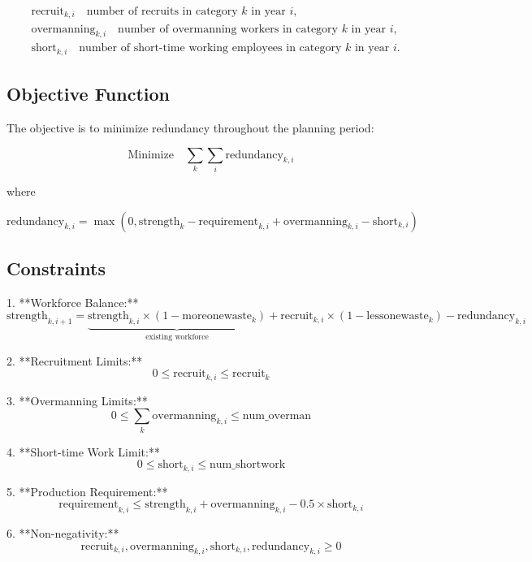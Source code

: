 \documentclass{article}
\begin{document}
\begin{align*}
    & \text{recruit}_{k, i} \quad \text{number of recruits in category } k \text{ in year } i, \\
    & \text{overmanning}_{k, i} \quad \text{number of overmanning workers in category } k \text{ in year } i, \\
    & \text{short}_{k, i} \quad \text{number of short-time working employees in category } k \text{ in year } i.
\end{align*}

\subsection*{Objective Function}

The objective is to minimize redundancy throughout the planning period:

\[
\text{Minimize} \quad \sum_{k} \sum_{i} \text{redundancy}_{k, i}
\]

where

\[
\text{redundancy}_{k, i} = \max\left(0, \text{strength}_{k} - \text{requirement}_{k, i} + \text{overmanning}_{k, i} - \text{short}_{k, i} \right)
\]

\subsection*{Constraints}

1. **Workforce Balance:**
   \[
   \text{strength}_{k, i+1} = \underbrace{\text{strength}_{k, i} \times (1 - \text{moreonewaste}_{k})}_{\text{existing\ workforce}} + \text{recruit}_{k, i} \times (1 - \text{lessonewaste}_{k}) - \text{redundancy}_{k, i} 
   \]

2. **Recruitment Limits:**
   \[
   0 \leq \text{recruit}_{k, i} \leq \text{recruit}_{k}
   \]

3. **Overmanning Limits:**
   \[
   0 \leq \sum_{k} \text{overmanning}_{k, i} \leq \text{num\_overman}
   \]

4. **Short-time Work Limit:**
   \[
   0 \leq \text{short}_{k, i} \leq \text{num\_shortwork}
   \]

5. **Production Requirement:**
   \[
   \text{requirement}_{k, i} \leq \text{strength}_{k, i} + \text{overmanning}_{k, i} - 0.5 \times \text{short}_{k, i}
   \]

6. **Non-negativity:**
   \[
   \text{recruit}_{k, i}, \text{overmanning}_{k, i}, \text{short}_{k, i}, \text{redundancy}_{k, i} \geq 0
   \]
\end{document}
